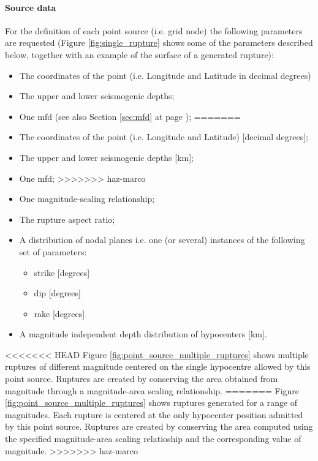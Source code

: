 \paragraph{Source data}
%
For the definition of each point source (i.e. grid node) the following 
parameters are requested (Figure \ref{fig:single_rupture} shows some of 
the parameters described below, together with an example of the 
surface of a generated rupture):
\begin{itemize}
<<<<<<< HEAD
\item The coordinates of the point (i.e. Longitude and Latitude in decimal 
    degrees)
\item The upper and lower seismogenic depths;
\item One \gls{mfd} (see also Section \ref{sec:mfd} at page 
    \pageref{sec:mfd});
=======
\item The coordinates of the point (i.e. Longitude and Latitude) [decimal 
    degrees];
\item The upper and lower seismogenic depths [km];
\item One \gls{mfd};
>>>>>>> haz-marco
\item One magnitude-scaling relationship;
\item The rupture aspect ratio;
\item A distribution of nodal planes i.e. one (or several) instances 
    of the following set of parameters:
\begin{itemize}
    \item \gls{strike} [degrees]
    \item \gls{dip} [degrees]
    \item \gls{rake} [degrees]
\end{itemize}
\item A magnitude independent depth distribution of hypocenters [km]. 
\end{itemize}
%
<<<<<<< HEAD
Figure \ref{fig:point_source_multiple_ruptures} shows multiple ruptures 
of different magnitude centered on the single hypocentre allowed 
by this point source. Ruptures are created by conserving the area obtained
from magnitude through a magnitude-area scaling relationship.
=======
Figure \ref{fig:point_source_multiple_ruptures} shows ruptures 
generated for a range of magnitudes. Each rupture is centered at the 
only hypocenter position admitted by this point source. 
Ruptures are created by conserving the area computed
using the specified mag\-ni\-tude-area scaling relatioship and the
corresponding value of magnitude.
>>>>>>> haz-marco

